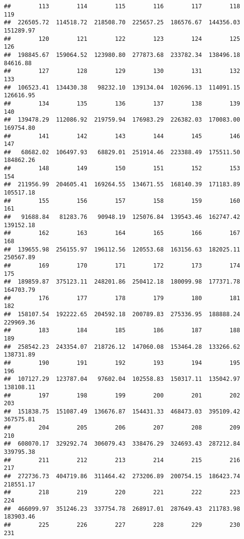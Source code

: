 \documentclass[
]{article}
\begin{document}
\begin{verbatim}
##        113        114        115        116        117        118        119 
##  226505.72  114518.72  218508.70  225657.25  186576.67  144356.03  151289.97 
##        120        121        122        123        124        125        126 
##  198845.67  159064.52  123980.80  277873.68  233782.34  138496.18   84616.88 
##        127        128        129        130        131        132        133 
##  106523.41  134430.38   98232.10  139134.04  102696.13  114091.15  126616.95 
##        134        135        136        137        138        139        140 
##  139478.29  112086.92  219759.94  176983.29  226382.03  170083.00  169754.80 
##        141        142        143        144        145        146        147 
##   68682.02  106497.93   68829.01  251914.46  223388.49  175511.50  184862.26 
##        148        149        150        151        152        153        154 
##  211956.99  204605.41  169264.55  134671.55  168140.39  171183.89  105517.18 
##        155        156        157        158        159        160        161 
##   91688.84   81283.76   90948.19  125076.84  139543.46  162747.42  139152.18 
##        162        163        164        165        166        167        168 
##  139655.98  256155.97  196112.56  120553.68  163156.63  182025.11  250567.89 
##        169        170        171        172        173        174        175 
##  189859.87  375123.11  248201.86  250412.18  180099.98  177371.78  164703.79 
##        176        177        178        179        180        181        182 
##  158107.54  192222.65  204592.18  200789.83  275336.95  188888.24  229969.36 
##        183        184        185        186        187        188        189 
##  258542.23  243354.07  218726.12  147060.08  153464.28  133266.62  138731.89 
##        190        191        192        193        194        195        196 
##  107127.29  123787.04   97602.04  102558.83  150317.11  135042.97  138108.11 
##        197        198        199        200        201        202        203 
##  151838.75  151087.49  136676.87  154431.33  468473.03  395109.42  367575.81 
##        204        205        206        207        208        209        210 
##  608070.17  329292.74  306079.43  338476.29  324693.43  287212.84  339795.38 
##        211        212        213        214        215        216        217 
##  272736.73  404719.86  311464.42  273206.89  200754.15  186423.74  218551.17 
##        218        219        220        221        222        223        224 
##  466099.97  351246.23  337754.78  268917.01  287649.43  211783.98  183903.46 
##        225        226        227        228        229        230        231 

\end{verbatim}
\end{document}

